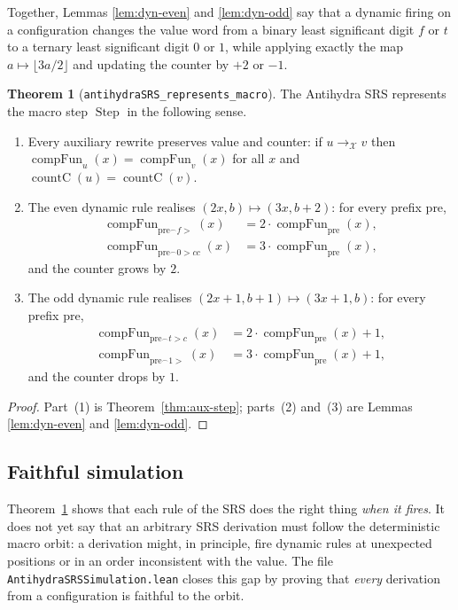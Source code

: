 \documentclass[11pt,a4paper]{article}
\theoremstyle{definition}
\newtheorem{theorem}[definition]{Theorem}
\newcommand{\gt}{>}
\newcommand{\conc}{{^\frown}}
\newcommand{\pre}{\text{pre}}
\newcommand{\compFun}{\operatorname{compFun}}
\newcommand{\countC}{\operatorname{countC}}
\newcommand{\auxRules}{\mathcal{X}}
\newcommand{\macroStep}{\operatorname{Step}}
\begin{document}
Together, Lemmas \ref{lem:dyn-even} and \ref{lem:dyn-odd} say that a
dynamic firing on a configuration changes the value word from a binary
least significant digit $f$ or $t$ to a ternary least significant digit
$0$ or $1$, while applying exactly the map $a\mapsto\lfloor3a/2\rfloor$
and updating the counter by $+2$ or $-1$.

\begin{theorem}[\texttt{antihydraSRS\_represents\_macro}]
  \label{thm:srs-represents-macro}
  The Antihydra SRS represents the macro step $\macroStep$ in the
  following sense.
  \begin{enumerate}
  \item Every auxiliary rewrite preserves value and counter:
    if $u\to_{\auxRules}v$ then
    $\compFun_u(x)=\compFun_v(x)$ for all $x$ and
    $\countC(u)=\countC(v)$.
  \item The even dynamic rule realises
    $(2x,b)\mapsto(3x,b+2)$: for every prefix $\pre$,
    \begin{align*}
      \compFun_{\pre\conc f\gt}(x)&=2\cdot\compFun_\pre(x),\\
      \compFun_{\pre\conc 0\gt cc}(x)&=3\cdot\compFun_\pre(x),
    \end{align*}
    and the counter grows by $2$.
  \item The odd dynamic rule realises
    $(2x+1,b+1)\mapsto(3x+1,b)$: for every prefix $\pre$,
    \begin{align*}
      \compFun_{\pre\conc t\gt c}(x)&=2\cdot\compFun_\pre(x)+1,\\
      \compFun_{\pre\conc 1\gt}(x)&=3\cdot\compFun_\pre(x)+1,
    \end{align*}
    and the counter drops by $1$.
  \end{enumerate}
\end{theorem}
\begin{proof}
  Part~(1) is Theorem~\ref{thm:aux-step}; parts~(2) and~(3) are
  Lemmas \ref{lem:dyn-even} and \ref{lem:dyn-odd}.
\end{proof}

\subsection{Faithful simulation}
\label{subsec:lean-simulation}

Theorem~\ref{thm:srs-represents-macro} shows that each rule of the SRS
does the right thing \emph{when it fires}.  It does not yet say that an
arbitrary SRS derivation must follow the deterministic macro orbit: a
derivation might, in principle, fire dynamic rules at unexpected
positions or in an order inconsistent with the value.  The file
\texttt{AntihydraSRSSimulation.lean} closes this gap by proving that
\emph{every} derivation from a configuration is faithful to the orbit.
\end{document}
